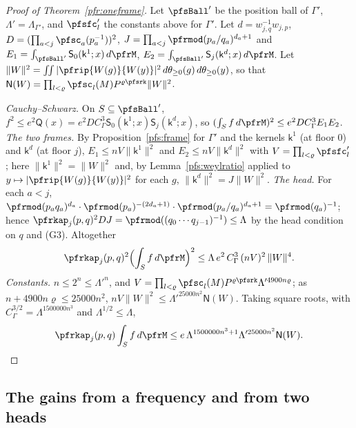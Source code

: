 \documentclass[10pt]{amsart}
\theoremstyle{definition}
\theoremstyle{remark}
\begin{document}
\begin{proof}[Proof of Theorem~\ref{pfr:oneframe}]
Let $\pfsBall'$ be the position ball of $\Gamma'$, $\Lambda'=\Lambda_{\Gamma'}$, and $\pfsfc'_l$ the constants above for $\Gamma'$. Let
$d=w_{j,q}^{-1}w_{j,p}$, $D=(\prod_{a<j}\pfsc_a(p_a^{-1}))^2$, $J=\prod_{a<j}\pfrmod(p_a/q_a)^{d_a+1}$ and
$E_1=\int_{\pfsBall'}\mathsf S_0(\mathsf k^1;x)\,d\pfrM$, $E_2=\int_{\pfsBall'}\mathsf S_j(\mathsf k^d;x)\,d\pfrM$. Let
$\|W\|^2=\iint|\pfrip{W(g)}{W(y)}|^2\,d\theta_{\ge0}(g)\,d\theta_{\ge0}(y)$, so that $\mathsf N(W)=\prod_{l<\varrho}\pfsc_l(M)
P^{\varrho\pfsrk}\|W\|^2$.

\emph{Cauchy--Schwarz.} On $S\subseteq\pfsBall'$, $f^2\le e^2\mathsf Q(x)=e^2DC_\Gamma^3\mathsf S_0(\mathsf k^1;x)\mathsf S_j(\mathsf k^d;x)$, so
$(\int_Sf\,d\pfrM)^2\le e^2DC_\Gamma^3E_1E_2$. \emph{The two frames.} By Proposition~\ref{pfs:frame} for $\Gamma'$ and the kernels $\mathsf k^1$
(at floor $0$) and $\mathsf k^d$ (at floor $j$), $E_1\le nV\|\mathsf k^1\|^2$ and $E_2\le nV\|\mathsf k^d\|^2$ with $V=\prod_{l<\varrho}\pfsfc'_l$;
here $\|\mathsf k^1\|^2=\|W\|^2$ and, by Lemma~\ref{pfs:weylratio} applied to $y\mapsto|\pfrip{W(g)}{W(y)}|^2$ for each $g$,
$\|\mathsf k^d\|^2=J\|W\|^2$. \emph{The head.} For each $a<j$,
$\pfrmod(p_aq_a)^{d_a}\cdot\pfrmod(p_a)^{-(2d_a+1)}\cdot\pfrmod(p_a/q_a)^{d_a+1}=\pfrmod(q_a)^{-1}$; hence
$\pfrkap_j(p,q)^2DJ=\pfrmod((q_0\cdots q_{j-1})^{-1})\le\Lambda$ by the head condition on $q$ and (G3). Altogether
\[
\pfrkap_j(p,q)^2\Bigl(\int_Sf\,d\pfrM\Bigr)^2\le\Lambda\,e^2\,C_\Gamma^3\,(nV)^2\,\|W\|^4 .
\]
\emph{Constants.} $n\le2^n\le\Lambda'^n$, and $V=\prod_{l<\varrho}\pfsc_l(M)P^{\varrho\pfsrk}\Lambda'^{4900n\varrho}$; as $n+4900n\varrho\le25000n^2$,
$nV\|W\|^2\le\Lambda'^{25000n^2}\mathsf N(W)$. Taking square roots, with $C_\Gamma^{3/2}=\Lambda^{1500000n^3}$ and $\Lambda^{1/2}\le\Lambda$,
\[
\pfrkap_j(p,q)\int_Sf\,d\pfrM\le e\,\Lambda^{1500000n^3+1}\Lambda'^{25000n^2}\mathsf N(W).\qedhere
\]
\end{proof}

\subsection{The gains from a frequency and from two heads}\label{pfs:ss-gains}
\end{document}
